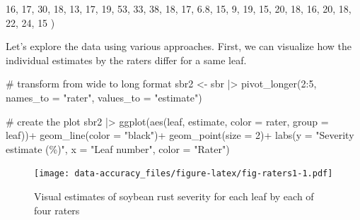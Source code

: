 \documentclass[
  letterpaper,
]{book}
\newenvironment{Shaded}{\begin{snugshade}}{\end{snugshade}}
\newcommand{\AttributeTok}[1]{\textcolor[rgb]{0.40,0.45,0.13}{#1}}
\newcommand{\CommentTok}[1]{\textcolor[rgb]{0.37,0.37,0.37}{#1}}
\newcommand{\DecValTok}[1]{\textcolor[rgb]{0.68,0.00,0.00}{#1}}
\newcommand{\FloatTok}[1]{\textcolor[rgb]{0.68,0.00,0.00}{#1}}
\newcommand{\FunctionTok}[1]{\textcolor[rgb]{0.28,0.35,0.67}{#1}}
\newcommand{\NormalTok}[1]{\textcolor[rgb]{0.00,0.23,0.31}{#1}}
\newcommand{\OtherTok}[1]{\textcolor[rgb]{0.00,0.23,0.31}{#1}}
\newcommand{\SpecialCharTok}[1]{\textcolor[rgb]{0.37,0.37,0.37}{#1}}
\newcommand{\StringTok}[1]{\textcolor[rgb]{0.13,0.47,0.30}{#1}}
\begin{document}
\begin{Shaded}
\begin{Highlighting}[]
\DecValTok{16}\NormalTok{, }\DecValTok{17}\NormalTok{,  }\DecValTok{30}\NormalTok{,   }\DecValTok{18}\NormalTok{,  }\DecValTok{13}\NormalTok{,}
\DecValTok{17}\NormalTok{, }\DecValTok{19}\NormalTok{,  }\DecValTok{53}\NormalTok{,   }\DecValTok{33}\NormalTok{,  }\DecValTok{38}\NormalTok{,}
\DecValTok{18}\NormalTok{, }\DecValTok{17}\NormalTok{, }\FloatTok{6.8}\NormalTok{,   }\DecValTok{15}\NormalTok{,   }\DecValTok{9}\NormalTok{,}
\DecValTok{19}\NormalTok{, }\DecValTok{15}\NormalTok{,  }\DecValTok{20}\NormalTok{,   }\DecValTok{18}\NormalTok{,  }\DecValTok{16}\NormalTok{,}
\DecValTok{20}\NormalTok{, }\DecValTok{18}\NormalTok{,  }\DecValTok{22}\NormalTok{,   }\DecValTok{24}\NormalTok{,  }\DecValTok{15}
\NormalTok{         )}
\end{Highlighting}
\end{Shaded}

Let's explore the data using various approaches. First, we can visualize
how the individual estimates by the raters differ for a same leaf.

\begin{Shaded}
\begin{Highlighting}[]
\CommentTok{\# transform from wide to long format}
\NormalTok{sbr2 }\OtherTok{\textless{}{-}}\NormalTok{ sbr }\SpecialCharTok{|\textgreater{}} 
  \FunctionTok{pivot\_longer}\NormalTok{(}\DecValTok{2}\SpecialCharTok{:}\DecValTok{5}\NormalTok{, }\AttributeTok{names\_to =} \StringTok{"rater"}\NormalTok{,}
               \AttributeTok{values\_to =} \StringTok{"estimate"}\NormalTok{) }

\CommentTok{\# create the plot}
\NormalTok{sbr2 }\SpecialCharTok{|\textgreater{}} 
  \FunctionTok{ggplot}\NormalTok{(}\FunctionTok{aes}\NormalTok{(leaf, estimate, }\AttributeTok{color =}\NormalTok{ rater,}
             \AttributeTok{group =}\NormalTok{ leaf))}\SpecialCharTok{+}
  \FunctionTok{geom\_line}\NormalTok{(}\AttributeTok{color =} \StringTok{"black"}\NormalTok{)}\SpecialCharTok{+}
  \FunctionTok{geom\_point}\NormalTok{(}\AttributeTok{size =} \DecValTok{2}\NormalTok{)}\SpecialCharTok{+}
  \FunctionTok{labs}\NormalTok{(}\AttributeTok{y =} \StringTok{"Severity estimate (\%)"}\NormalTok{,}
       \AttributeTok{x =} \StringTok{"Leaf number"}\NormalTok{,}
       \AttributeTok{color =} \StringTok{"Rater"}\NormalTok{)}
\end{Highlighting}
\end{Shaded}

\begin{figure}

{\centering \texttt{[image: data-accuracy\_files/figure-latex/fig-raters1-1.pdf]}

}

\caption{\label{fig-raters1}Visual estimates of soybean rust severity
for each leaf by each of four raters}

\end{figure}
\end{document}
